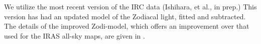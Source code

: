 \documentclass[preprint2,longabstract]{aastex}
\begin{document}

      We utilize the most recent version of the IRC data (Ishihara, et al., in prep.) This version has had an updated model of the Zodiacal light, fitted and subtracted. The details of the improved Zodi-model, which offers an improvement over that used for the IRAS all-sky maps, are given in \cite{kondo16}.
\end{document}
